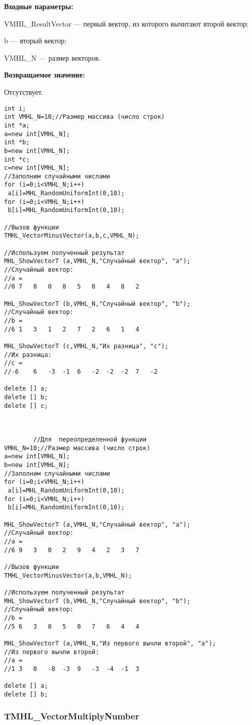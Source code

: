 \documentclass[a4paper,12pt]{article}
\begin{document}
\textbf{Входные параметры:}

 VMHL\_ResultVector --- первый вектор, из которого вычитают второй вектор;
  
 b --- вторый вектор;
 
 VMHL\_N --- размер векторов.

\textbf{Возвращаемое значение:}

Отсутствует.


\begin{lstlisting}[label=code_use_TMHL_VectorMinusVector,caption=Пример использования]
int i;
int VMHL_N=10;//Размер массива (число строк)
int *a;
a=new int[VMHL_N];
int *b;
b=new int[VMHL_N];
int *c;
c=new int[VMHL_N];
//Заполним случайными числами
for (i=0;i<VMHL_N;i++)
 a[i]=MHL_RandomUniformInt(0,10);
for (i=0;i<VMHL_N;i++)
 b[i]=MHL_RandomUniformInt(0,10);

//Вызов функции
TMHL_VectorMinusVector(a,b,c,VMHL_N);

//Используем полученный результат
MHL_ShowVectorT (a,VMHL_N,"Случайный вектор", "a");
//Случайный вектор:
//a =
//0	7	0	0	8	5	0	4	8	2

MHL_ShowVectorT (b,VMHL_N,"Случайный вектор", "b");
//Случайный вектор:
//b =
//6	1	3	1	2	7	2	6	1	4

MHL_ShowVectorT (c,VMHL_N,"Их разница", "c");
//Их разница:
//c =
//-6	6	-3	-1	6	-2	-2	-2	7	-2

delete [] a;
delete [] b;
delete [] c;
		
		
		
		//Для  переопределенной функции
VMHL_N=10;//Размер массива (число строк)
a=new int[VMHL_N];
b=new int[VMHL_N];
//Заполним случайными числами
for (i=0;i<VMHL_N;i++)
 a[i]=MHL_RandomUniformInt(0,10);
for (i=0;i<VMHL_N;i++)
 b[i]=MHL_RandomUniformInt(0,10);

MHL_ShowVectorT (a,VMHL_N,"Случайный вектор", "a");
//Случайный вектор:
//a =	
//6	9	3	0	2	9	4	2	3	7

//Вызов функции
TMHL_VectorMinusVector(a,b,VMHL_N);

//Используем полученный результат
MHL_ShowVectorT (b,VMHL_N,"Случайный вектор", "b");
//Случайный вектор:
//b =	
//5	6	3	8	5	0	7	6	4	4

MHL_ShowVectorT (a,VMHL_N,"Из первого вычли второй", "a");
//Из первого вычли второй:
//a =	
//1	3	0	-8	-3	9	-3	-4	-1	3         

delete [] a;
delete [] b;
\end{lstlisting}

\subsubsection{TMHL\_VectorMultiplyNumber}\label{TMHL_VectorMultiplyNumber}
\end{document}
